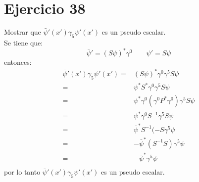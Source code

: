 \section*{Ejercicio 38}
Mostrar que ${\bar{\psi}}'({x}') \gamma_5 {\psi}'({x}')$ es un pseudo escalar.\\
Se tiene que:
\begin{equation*}
    \bar{\psi}'=\left(S\psi\right)^* \gamma^0 \qquad \psi'=S\psi
\end{equation*}
entonces:
\begin{align*}
    {\bar{\psi}}'({x}') \gamma_5 {\psi}'({x}') =& \left(S\psi\right)^* \gamma^0 \gamma^5 S\psi \\
    =& \psi^* S^* \gamma^0  \gamma^5 S\psi \\
    =& \psi^* \gamma^0 \left(\gamma^0P^* \gamma^0\right) \gamma^5 S\psi \\
    =& \psi^* \gamma^0 S^{-1} \gamma^5 S \psi \\
    =& \bar{\psi}^* S^{-1} (-S\gamma^5 \psi \\
    =& -\bar{\psi}^* (S^{-1} S)\gamma^5 \psi \\ 
    =& - \bar{\psi}^* \gamma^5 \psi \\ 
\end{align*}
por lo tanto ${\bar{\psi}}'({x}') \gamma_5 {\psi}'({x}')$ es un pseudo escalar.